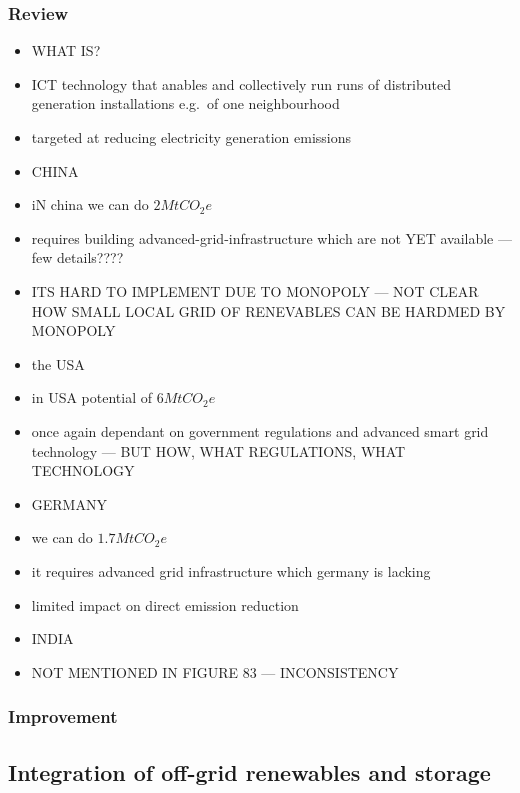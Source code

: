 \documentclass[11pt, twocolumn]{article}
\begin{document}
\subsubsection{Review}
\begin{itemize}
\item WHAT IS?
\item ICT technology that anables and collectively run runs of distributed generation installations e.g.\ of one neighbourhood
\item targeted at reducing electricity generation emissions


\item CHINA
\item iN china we can do $2 Mt CO_2e$
\item requires building advanced-grid-infrastructure which are not YET available --- few details????
\item ITS HARD TO IMPLEMENT DUE TO MONOPOLY --- NOT CLEAR HOW SMALL LOCAL GRID OF RENEVABLES CAN BE HARDMED BY MONOPOLY

\item the USA
\item in USA potential of $6 MtCO_2e$
\item once again dependant on government regulations and advanced smart grid technology --- BUT HOW, WHAT REGULATIONS, WHAT TECHNOLOGY

\item GERMANY
\item we can do $1.7 Mt CO_2e$

\item it requires advanced grid infrastructure which germany is lacking
\item limited impact on direct emission reduction


\item INDIA
\item NOT MENTIONED IN FIGURE 83 --- INCONSISTENCY

\end{itemize}
\subsubsection{Improvement}

\subsection{Integration of off-grid renewables and storage}
\end{document}
